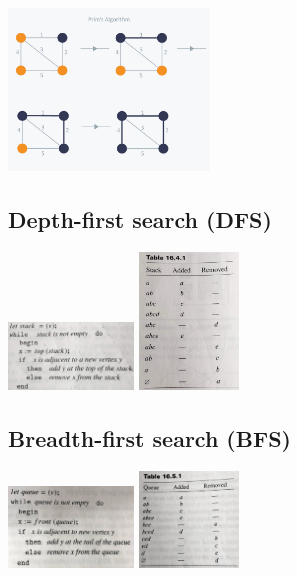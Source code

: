 \documentclass{article}
\begin{document}
\begin{multicols}{2}
\includegraphics[width=0.4\textwidth]{prim}

\subsection{Depth-first search (DFS)}
\includegraphics[width=0.25\textwidth]{DFS_alg}
\includegraphics[width=0.2\textwidth]{DFS_dia}


\subsection{Breadth-first search (BFS)}
\includegraphics[width=0.25\textwidth]{BFS_alg}
\includegraphics[width=0.2\textwidth]{BFS_dia}


\end{multicols}
\end{document}
